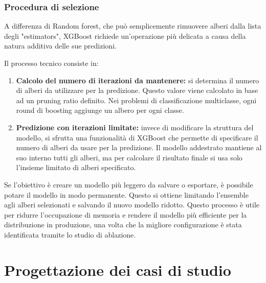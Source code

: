 \documentclass[a4paper,12pt]{report}
\begin{document}
	\subsection{Procedura di selezione}
	A differenza di Random forest, che può semplicemente rimuovere alberi dalla lista degli "estimators", XGBoost richiede un'operazione più delicata a causa della natura additiva delle sue predizioni.
	
	Il processo tecnico consiste in:
	\begin{enumerate}
		\item \textbf{Calcolo del numero di iterazioni da mantenere:} si determina il numero di alberi da utilizzare per la predizione. Questo valore viene calcolato in base ad un pruning ratio definito. Nei problemi di classificazione multiclasse, ogni round di boosting aggiunge un albero per ogni classe.
		\item \textbf{Predizione con iterazioni limitate:} invece di modificare la struttura del modello, si sfrutta una funzionalità di XGBoost che permette di specificare il numero di alberi da usare per la predizione. Il modello addestrato mantiene al suo interno tutti gli alberi, ma per calcolare il risultato finale si usa solo l'insieme limitato di alberi specificato.
	\end{enumerate}
	
	Se l'obiettivo è creare un modello più leggero da salvare o esportare, è possibile potare il modello in modo permanente. Questo si ottiene limitando l'ensemble agli alberi selezionati e salvando il nuovo modello ridotto. Questo processo è utile per ridurre l'occupazione di memoria e rendere il modello più efficiente per la distribuzione in produzione, una volta che la migliore configurazione è stata identificata tramite lo studio di ablazione.
	
	\chapter{Progettazione dei casi di studio}
	
\end{document}
